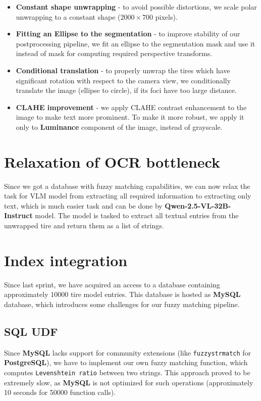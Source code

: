\documentclass{article}
\begin{document}
\begin{itemize}
    \item \textbf{Constant shape unwrapping} - to avoid possible distortions, we scale polar unwrapping to a constant shape ($2000 \times 700$ pixels).
    \item \textbf{Fitting an Ellipse to the segmentation} - to improve stability of our postprocessing pipeline, we fit an ellipse to the segmentation mask and use it instead of mask for computing required perspective transforms.
    \item \textbf{Conditional translation} - to properly unwrap the tires which have significant rotation with respect to the camera view, we conditionally translate the image (ellipse to circle), if its foci have too large distance.
    \item \textbf{CLAHE improvement} - we apply CLAHE contrast enhancement to the image to make text more prominent. To make it more robust, we apply it only to \textbf{Luminance} component of the image, instead of grayscale.
\end{itemize}

\section{Relaxation of OCR bottleneck}

Since we got a database with fuzzy matching capabilities, we can now relax the task for VLM model from extracting all required information to extracting only text, which is much easier task and can be done by \textbf{Qwen-2.5-VL-32B-Instruct} model. The model is tasked to extract all textual entries from the unwrapped tire and return them as a list of strings.

\section{Index integration}

Since last sprint, we have acquired an access to a database containing approximately 10000 tire model entries. This database is hosted as \textbf{MySQL} database, which introduces some challenges for our fuzzy matching pipeline.

\subsection{SQL UDF}

Since \textbf{MySQL} lacks support for community extensions (like \texttt{fuzzystrmatch} for \textbf{PostgreSQL}), we have to implement our own fuzzy matching function, which computes \texttt{Levenshtein ratio} between two strings. This approach proved to be extremely slow, as \textbf{MySQL} is not optimized for such operations (approximately 10 seconds for 50000 function calls).
\end{document}
